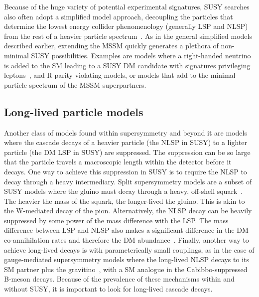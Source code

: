 
Because of the huge variety of potential experimental signatures, SUSY searches also often adopt a simplified model approach, 
decoupling the particles that determine the lowest energy collider phenomenology
(generally LSP and NLSP) from the rest of a heavier particle spectrum~\cite{Alves:2011wf}. 
As in the general simplified models described earlier, extending the MSSM quickly generates a plethora of non-minimal SUSY possibilities.
Examples are models where a right-handed neutrino is added to the SM leading to a SUSY DM candidate with signatures privileging leptons~\cite{Arina:2015uea},%
and R-parity violating models, 
or models that add to the minimal particle spectrum of the MSSM superpartners. 

\subsection{Long-lived particle models}
\label{sec:LLPModels}


Another class of models found within supersymmetry and beyond it are models where the cascade decays of a heavier particle (the NLSP in SUSY) to a lighter particle (the DM LSP in SUSY) are suppressed. The suppression can be so large that the particle travels a macroscopic length within the detector before it decays. One way to achieve this suppression in SUSY is to require the NLSP to decay through a heavy intermediary. Split supersymmetry models are a subset of SUSY models where the gluino must decay through a heavy, off-shell squark~\cite{Masiero:2004ft}. The heavier the mass of the squark, the longer-lived the gluino. This is akin to the W-mediated decay of the pion. 
Alternatively, the NLSP decay can be heavily suppressed by some power of the mass difference with the LSP. The mass difference between LSP and NLSP also makes a significant difference in the DM co-annihilation rates and therefore the DM abundance~\cite{Ellis:1999mm}. Finally, another way to achieve long-lived decays is with parameterically small couplings, as in the case of gauge-mediated supersymmetry models where the long-lived NLSP decays to its SM partner plus the gravitino~\cite{Dimopoulos:1996vz}, with a SM analogue in the Cabibbo-suppressed B-meson decays. Because of the prevalence of these mechanisms within and without SUSY, it is important to look for long-lived cascade decays.

